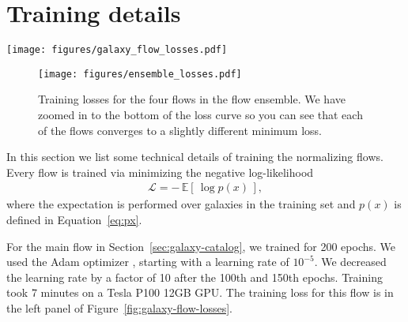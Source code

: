 \documentclass[twocolumn,twocolappendix]{aastex631}
\begin{document}

\newpage 

\appendix

\section{Training details}
\label{app:training-details}

\begin{figure*}[t!]
    \begin{centering}
        \texttt{[image: figures/galaxy\_flow\_losses.pdf]}
        \caption{
            Training losses for the normalizing flows used to simulate the galaxy catalog.
            Left: losses for the regular flow.
            Right: losses for the conditional flow.
        }
        \label{fig:galaxy-flow-losses}
    \end{centering}
\end{figure*}

\begin{figure}[t!]
    \begin{centering}
        \texttt{[image: figures/ensemble\_losses.pdf]}
        \caption{
            Training losses for the four flows in the flow ensemble.
            We have zoomed in to the bottom of the loss curve so you can see that each of the flows converges to a slightly different minimum loss.
        }
        \label{fig:ensemble-losses}
    \end{centering}
\end{figure}

In this section we list some technical details of training the normalizing flows.
Every flow is trained via minimizing the negative log-likelihood
\begin{align}
    \mathcal{L} = - \, \mathbb{E}[ \, \log p(x) \, ],
\end{align}
where the expectation is performed over galaxies in the training set and $p(x)$ is defined in Equation~\ref{eq:px}.

For the main flow in Section~\ref{sec:galaxy-catalog}, we trained for 200 epochs.
We used the Adam optimizer \citep{adam}, starting with a learning rate of $10^{-5}$.
We decreased the learning rate by a factor of 10 after the 100th and 150th epochs.
Training took 7 minutes on a Tesla P100 12GB GPU.
The training loss for this flow is in the left panel of Figure~\ref{fig:galaxy-flow-losses}.
\end{document}
